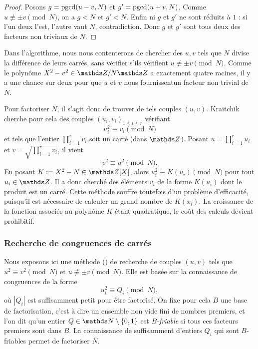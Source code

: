 \begin{proof}
	Posons $g =\operatorname{pgcd}(u-v, N)$ et $g' = \operatorname{pgcd}(u+v, N)$. Comme $u\not\equiv \pm
	v\pmod{N}$, on a $g<N$ et $g'<N$. Enfin ni $g$ et $g'$ ne sont réduits à
	$1$ : si l'un deux l'est, l'autre vaut $N$, contradiction. Donc $g$ et $g'$
	sont tous deux des facteurs non triviaux de $N$.
\end{proof}

\begin{remarque}
	Dans l'algorithme, nous nous contenterons de chercher des $u, v$ tels que
	$N$ divise la différence de leurs carrés, sans vérifier s'ils vérifient $u
	\not\equiv \pm v\pmod{N}$. Comme le polynôme $X^2 - v^2 \in \Z/N\Z$ a
	exactement quatre racines, il y a \og{} une chance sur deux \fg  pour que
	$u$ et $v$ nous fournissentun facteur non trivial de $N$. \\
\end{remarque}

Pour factoriser $N$, il s'agit donc de trouver de tels couples $(u, v)$.
Kraitchik cherche pour cela des couples $(u_i, v_i)_{1\leq i \leq r}$ vérifiant
\[u_i^2 \equiv v_i \pmod{N}\] et tels que l'entier $\prod_{i=1}^r v_i$ soit un
carré (dans $\Z$). Posant $u = \prod_{i=1}^r u_i$ et $v = \sqrt{\prod_{i=1}^r
v_i}$, il vient \[v^2\equiv u^2 \pmod{N}.\] En posant $K := X^2 - N \in \Z[X]$,
alors $u_i^2 \equiv K(u_i) \pmod{N}$ pour tout $u_i\in \Z$.  Il a donc cherché
des éléments $v_i$ de la forme $K(u_i)$ dont le produit est un carré. Cette
méthode souffre toutefois d'un problème d'efficacité, puisqu'il est nécessaire
de calculer un grand nombre de $K(x_i)$. La croissance de la fonction associée
au polynôme $K$ étant quadratique, le coût des calculs devient prohibitif.


\subsubsection{Recherche de congruences de carrés}

Nous exposons ici une méthode () de recherche de couples $(u,
v)$ tels que $u^2\equiv v^2\pmod{N}$ et $u\not\equiv \pm v \pmod{N}$. Elle est
basée sur la connaissance de congruences de la forme \[u_i^2 \equiv Q_i
\pmod{N},\] où $| Q_i |$ est suffisamment petit pour être factorisé. On fixe
pour cela $B$ une base de factorisation, c'est à dire un ensemble non vide fini
de nombres premiers, et l'on dit qu'un entier $Q\in \N\setminus \{0, 1\}$ est
\emph{$B$-friable} si tous ces facteurs premiers sont dans $B$. La connaissance
de suffisamment d'entiers $Q_i$ qui sont $B$-friables permet de factoriser $N$.

